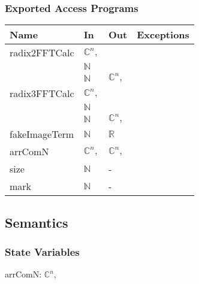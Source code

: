 \documentclass[12pt, titlepage]{article}
\begin{document}
\subsubsection{Exported Access Programs}

\begin{center}
\begin{tabular}{p{3cm} p{4cm} p{4cm} p{2cm}}
\hline
\textbf{Name} & \textbf{In} & \textbf{Out} & \textbf{Exceptions} \\
\hline
radix2FFTCalc&$\mathbb{C}^ n,$\\&$\mathbb{N}$\\&$\mathbb{N}$& $\mathbb{C}^ n,$& \\
radix3FFTCalc&$\mathbb{C}^ n,$\\&$\mathbb{N}$\\&$\mathbb{N}$&$\mathbb{C}^ n,$& \\
fakeImageTerm&$\mathbb{N}$ &$\mathbb{R}$& \\
arrComN&$\mathbb{C}^ n,$&$\mathbb{C}^ n,$&\\
size&$\mathbb{N}$& -&\\
mark&$\mathbb{N}$& -&\\

\hline
\end{tabular}
\end{center}

\subsection{Semantics}


\subsubsection{State Variables}
arrComN: $\mathbb{C}^ n,$
\end{document}

